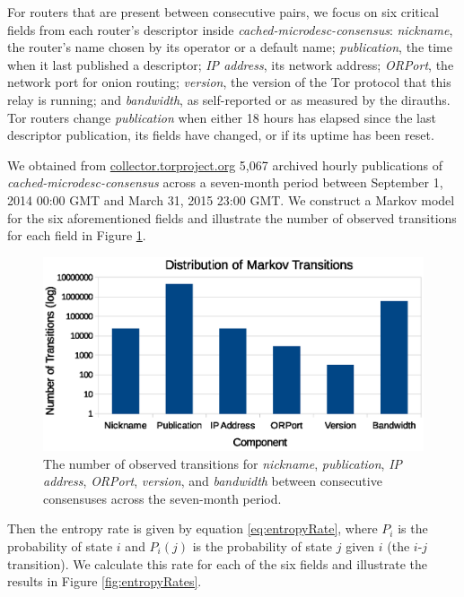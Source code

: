 \documentclass{sig-alternate}
\begin{document}
For routers that are present between consecutive pairs, we focus on six critical fields from each router's descriptor inside \emph{cached-microdesc-consensus}: \emph{nickname}, the router's name chosen by its operator or a default name; \emph{publication}, the time when it last published a descriptor; \emph{IP address}, its network address; \emph{ORPort}, the network port for onion routing; \emph{version}, the version of the Tor protocol that this relay is running; and \emph{bandwidth}, as self-reported or as measured by the dirauths. Tor routers change \emph{publication} when either 18 hours has elapsed since the last descriptor publication, its fields have changed, or if its uptime has been reset.

We obtained from \url{collector.torproject.org} 5,067 archived hourly publications of \emph{cached-microdesc-consensus} across a seven-month period between September 1, 2014 00:00 GMT and March 31, 2015 23:00 GMT. We construct a Markov model for the six aforementioned fields and illustrate the number of observed transitions for each field in Figure \ref{fig:transitionCount}.

\begin{figure}[h]
	\centering
	\includegraphics[width=\linewidth]{../analysis/MarkovTransitionDistribution.eps}
	\caption{The number of observed transitions for \emph{nickname}, \emph{publication}, \emph{IP address}, \emph{ORPort}, \emph{version}, and \emph{bandwidth} between consecutive consensuses across the seven-month period.}
	\label{fig:transitionCount}
\end{figure}

Then the entropy rate is given by equation \ref{eq:entropyRate}, where $ P_{i} $ is the probability of state $ i $ and $ P_{i}(j) $ is the probability of state $ j $ given $ i $ (the $ i $-$ j $ transition). We calculate this rate for each of the six fields and illustrate the results in Figure \ref{fig:entropyRates}.
\end{document}
